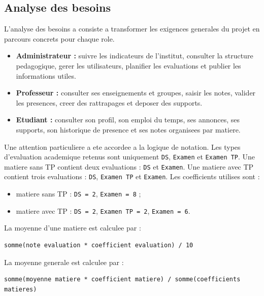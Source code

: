 \documentclass[12pt,a4paper]{report}
\begin{document}
\subsection{Analyse des besoins}

L'analyse des besoins a consiste a transformer les exigences generales du projet en parcours concrets pour chaque role.

\begin{itemize}[itemsep=0.3em]
    \item \textbf{Administrateur :} suivre les indicateurs de l'institut, consulter la structure pedagogique, gerer les utilisateurs, planifier les evaluations et publier les informations utiles.
    \item \textbf{Professeur :} consulter ses enseignements et groupes, saisir les notes, valider les presences, creer des rattrapages et deposer des supports.
    \item \textbf{Etudiant :} consulter son profil, son emploi du temps, ses annonces, ses supports, son historique de presence et ses notes organisees par matiere.
\end{itemize}

Une attention particuliere a ete accordee a la logique de notation. Les types d'evaluation academique retenus sont uniquement \texttt{DS}, \texttt{Examen} et \texttt{Examen TP}. Une matiere sans TP contient deux evaluations : \texttt{DS} et \texttt{Examen}. Une matiere avec TP contient trois evaluations : \texttt{DS}, \texttt{Examen TP} et \texttt{Examen}. Les coefficients utilises sont :

\begin{itemize}[itemsep=0.3em]
    \item matiere sans TP : \texttt{DS = 2}, \texttt{Examen = 8} ;
    \item matiere avec TP : \texttt{DS = 2}, \texttt{Examen TP = 2}, \texttt{Examen = 6}.
\end{itemize}

La moyenne d'une matiere est calculee par :

\begin{verbatim}
somme(note evaluation * coefficient evaluation) / 10
\end{verbatim}

La moyenne generale est calculee par :

\begin{verbatim}
somme(moyenne matiere * coefficient matiere) / somme(coefficients matieres)
\end{verbatim}
\end{document}

